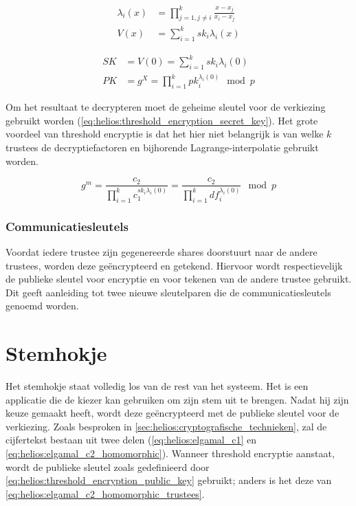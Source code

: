 \begin{align}
  \label{eq:helios:threshold_encryption_lagrange}
  \lambda_i(x) & = \prod_{j=1, j\not=i}^k{\frac{x - x_j}{x_i - x_j}} \\
  \label{eq:helios:threshold_encryption_polynomial}
  V(x) & = \sum_{i=1}^k{{sk}_i\lambda_i(x)}
\end{align}

\begin{align}
  \label{eq:helios:threshold_encryption_secret_key}
  SK & = V(0) = \sum_{i=1}^k{{sk}_i\lambda_i(0)} \\
  \label{eq:helios:threshold_encryption_public_key}
  PK & = g^{X} = \prod_{i=1}^k{{pk}_i^{\lambda_i(0)}} \mod{p}
\end{align}

\npar Om het resultaat te decrypteren moet de geheime sleutel voor de verkiezing gebruikt worden (\ref{eq:helios:threshold_encryption_secret_key}). Het grote voordeel van threshold encryptie is dat het hier niet belangrijk is van welke $k$ trustees de decryptiefactoren en bijhorende Lagrange-interpolatie gebruikt worden.

\begin{equation}
  \label{eq:helios:threshold_encryption_m}
  g^m = \frac{c_2}{\prod_{i=1}^k{c_1^{{sk}_i\lambda_i(0)}}} = \frac{c_2}{\prod_{i=1}^k{{df}_i^{\lambda_i(0)}}} \mod{p}
\end{equation}


\subsubsection{Communicatiesleutels}
\label{sec:helios:communicatiesleutels}

Voordat iedere trustee zijn gegenereerde shares doorstuurt naar de andere trustees, worden deze ge\"encrypteerd en getekend. Hiervoor wordt respectievelijk de publieke sleutel voor encryptie en voor tekenen van de andere trustee gebruikt. Dit geeft aanleiding tot twee nieuwe sleutelparen die de communicatiesleutels genoemd worden.

\section{Stemhokje}
\label{sec:helios:stemhokje}

Het stemhokje staat volledig los van de rest van het systeem. Het is een applicatie die de kiezer kan gebruiken om zijn stem uit te brengen. Nadat hij zijn keuze gemaakt heeft, wordt deze ge\"encrypteerd met de publieke sleutel voor de verkiezing. Zoals besproken in \ref{sec:helios:cryptografische_technieken}, zal de cijfertekst bestaan uit twee delen (\ref{eq:helios:elgamal_c1} en \ref{eq:helios:elgamal_c2_homomorphic}). Wanneer threshold encryptie aanstaat, wordt de publieke sleutel zoals gedefinieerd door \ref{eq:helios:threshold_encryption_public_key} gebruikt; anders is het deze van \ref{eq:helios:elgamal_c2_homomorphic_trustees}.

